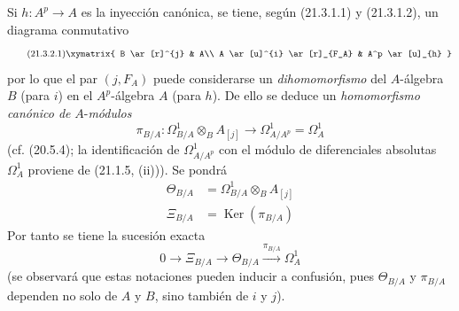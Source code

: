 \begin{env}[21.3.2]
\label{0.21.3.2-fr}
Si $h:A^p\to A$ es la inyección canónica, se tiene, según (21.3.1.1) y
(21.3.1.2), un diagrama conmutativo
\begin{equation}
\tag{21.3.2.1}\label{0.21.3.2.1-fr}
\xymatrix{
 B \ar[r]^{j} & A\\
 A \ar[u]^{i} \ar[r]_{F_A} & A^p \ar[u]_{h}
}
\end{equation}
por lo que el par $(j,F_A)$ puede considerarse un \emph{dihomomorfismo} del
$A$-álgebra $B$ (para $i$) en el $A^p$-álgebra $A$ (para $h$).
De ello se deduce un \emph{homomorfismo canónico de} $A$-\emph{módulos}
\begin{equation}
\tag{21.3.2.2}\label{0.21.3.2.2-fr}
\pi_{B/A}:\Omega^1_{B/A}\otimes_B A_{[j]}\longrightarrow
\Omega^1_{A/A^p}=\Omega^1_A
\end{equation}
(cf. (20.5.4); la identificación de $\Omega^1_{A/A^p}$ con el módulo de
diferenciales absolutas $\Omega^1_A$ proviene de (21.1.5, (ii))).
Se pondrá
\begin{align}
\tag{21.3.2.3}\label{0.21.3.2.3-fr}
\Theta_{B/A}&=\Omega^1_{B/A}\otimes_B A_{[j]}\\
\tag{21.3.2.4}\label{0.21.3.2.4-fr}
\Xi_{B/A}&=\operatorname{Ker}(\pi_{B/A})
\end{align}
Por tanto se tiene la sucesión exacta
\begin{equation}
\tag{21.3.2.5}\label{0.21.3.2.5-fr}
0\to\Xi_{B/A}\to\Theta_{B/A}\xrightarrow{\pi_{B/A}}\Omega^1_A
\end{equation}
(se observará que estas notaciones pueden inducir a confusión, pues
$\Theta_{B/A}$ y $\pi_{B/A}$ dependen no solo de $A$ y $B$, sino también de
$i$ y $j$).
\end{env}

